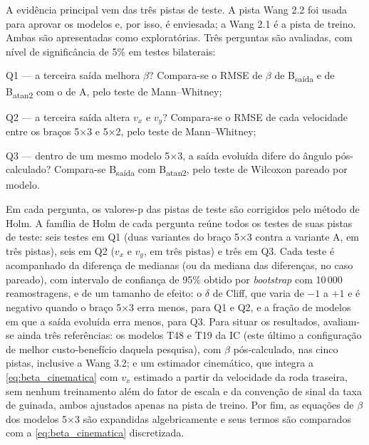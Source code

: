 A evidência principal vem das três pistas de teste. A pista Wang 2.2 foi usada para aprovar os modelos e, por isso, é enviesada; a Wang 2.1 é a pista de treino. Ambas são apresentadas como exploratórias. Três perguntas são avaliadas, com nível de significância de 5\% em testes bilaterais:

\begin{alineas}
    \item Q1 --- a terceira saída melhora $\beta$? Compara-se o RMSE de $\beta$ de B\textsubscript{saída} e de B\textsubscript{atan2} com o de A, pelo teste de Mann--Whitney;
    \item Q2 --- a terceira saída altera $v_x$ e $v_y$? Compara-se o RMSE de cada velocidade entre os braços 5×3 e 5×2, pelo teste de Mann--Whitney;
    \item Q3 --- dentro de um mesmo modelo 5×3, a saída evoluída difere do ângulo pós-calculado? Compara-se B\textsubscript{saída} com B\textsubscript{atan2}, pelo teste de Wilcoxon pareado por modelo.
\end{alineas}

Em cada pergunta, os valores-p das pistas de teste são corrigidos pelo método de Holm. A família de Holm de cada pergunta reúne todos os testes de suas pistas de teste: seis testes em Q1 (duas variantes do braço 5×3 contra a variante A, em três pistas), seis em Q2 ($v_x$ e $v_y$, em três pistas) e três em Q3. Cada teste é acompanhado da diferença de medianas (ou da mediana das diferenças, no caso pareado), com intervalo de confiança de 95\% obtido por \textit{bootstrap} com 10\,000 reamostragens, e de um tamanho de efeito: o $\delta$ de Cliff, que varia de $-1$ a $+1$ e é negativo quando o braço 5×3 erra menos, para Q1 e Q2, e a fração de modelos em que a saída evoluída erra menos, para Q3.
Para situar os resultados, avaliam-se ainda três referências: os modelos T48 e T19 da IC (este último a configuração de melhor custo-benefício daquela pesquisa), com $\beta$ pós-calculado, nas cinco pistas, inclusive a Wang 3.2; e um estimador cinemático, que integra a \autoref{eq:beta_cinematica} com $v_x$ estimado a partir da velocidade da roda traseira, sem nenhum treinamento além do fator de escala e da convenção de sinal da taxa de guinada, ambos ajustados apenas na pista de treino. Por fim, as equações de $\beta$ dos modelos 5×3 são expandidas algebricamente e seus termos são comparados com a \autoref{eq:beta_cinematica} discretizada.

